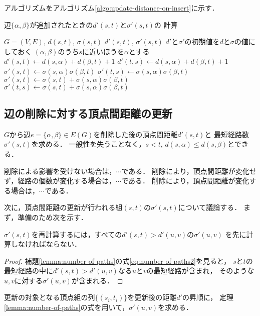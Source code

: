 アルゴリズムをアルゴリズム\ref{algo:update-distance-on-insert}に示す．
\begin{algorithm}[H]
  \caption{辺$\{\alpha,\beta\}$が追加されたときの$d'(s,t)$と$\sigma'(s,t)$の
  計算}\label{algo:update-distance-on-insert}
  \begin{algorithmic}[1]
    \Require $G=(V,E),\,d(s,t),\,\sigma(s,t)$
    \Ensure $d'(s,t),\,\sigma'(s,t)$
    \State $d'$と$\sigma'$の初期値を$d$と$\sigma$の値にしておく
    \State $(\alpha,\beta)$のうち$s$に近いほうを$\alpha$とする
    \State $d'(s,t)\gets d(s,\alpha)+d(\beta,t)+1$
    \State $d'(t,s)\gets d(s,\alpha)+d(\beta,t)+1$
    \State $\sigma'(s,t)\gets \sigma(s,\alpha)\sigma(\beta,t)$
    \State $\sigma'(t,s)\gets \sigma(s,\alpha)\sigma(\beta,t)$
    \State $\sigma'(s,t)\gets \sigma(s,t)+\sigma(s,\alpha)\sigma(\beta,t)$
    \State $\sigma'(t,s)\gets \sigma(s,t)+\sigma(s,\alpha)\sigma(\beta,t)$
    \Else
    \EndIf
    \EndFor
  \end{algorithmic}
\end{algorithm}

\subsection{辺の削除に対する頂点間距離の更新}
\label{subsect:update-lower-bound-of-diameter}
$G$から辺$e=\{\alpha,\beta\}\in E(G)$を削除した後の頂点間距離$d'(s,t)$と
最短経路数$\sigma'(s,t)$を求める．
一般性を失うことなく，$s<t,\,d(s,\alpha)\leq d(s,\beta)$とできる．

削除による影響を受けない場合は，$\cdots$である．
削除により，頂点間距離が変化せず，経路の個数が変化する場合は，$\cdots$である．
削除により，頂点間距離が変化する場合は，$\cdots$である．

次に，頂点間距離の更新が行われる組$(s,t)$の$\sigma'(s,t)$について議論する．
まず，準備のため次を示す．
\begin{collary}
  $\sigma'(s,t)$を再計算するには，すべての$d'(s,t)>d'(u,v)$の$\sigma'(u,v)$
  を先に計算しなければならない．
\end{collary}
\begin{proof}
  補題\ref{lemma:number-of-paths}の式\ref{eq:number-of-paths2}を見ると，
  $s$と$t$の最短経路の中に$d'(s,t)>d'(u,v)$なる$u$と$v$の最短経路が含まれ，
  そのような$u,v$に対する$\sigma'(u,v)$が含まれる．
\end{proof}
更新の対象となる頂点組の列$\{(s_i,t_i)\}$を更新後の距離$d'$の昇順に，
定理\ref{lemma:number-of-paths}の式を用いて，$\sigma'(u,v)$を求める．

